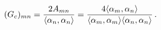 \begin{equation}
  \label{groupmetric}  (G_c)_{mn}={2A_{mn}\over\langle\alpha_n,\alpha_n
\rangle}=\frac{4\langle\alpha_m,\alpha_n\rangle} {\langle\alpha_m,\alpha_m
\rangle\langle\alpha_n,\alpha_n
\rangle}\, .
   \end{equation} 
